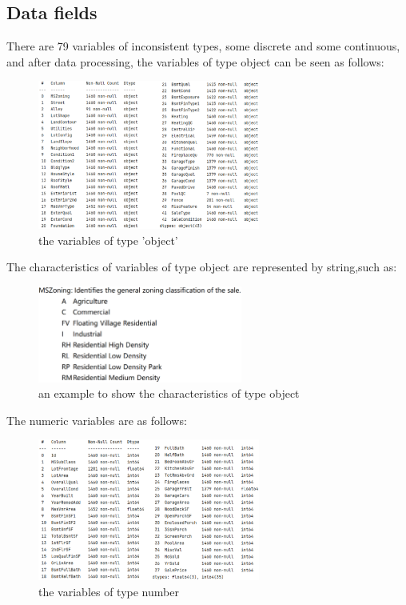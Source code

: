 \documentclass{amsart}
\begin{document}
	\subsection{Data fields}\label{sec-intro}
	There are 79 variables of inconsistent types, some discrete and some continuous, and after data processing, the variables of type object can be seen as follows:
	\begin{figure}[H]
		\centering
		\includegraphics[width=0.65\textwidth]{../Data/Fig1}
		\caption{the variables of type 'object'}\label{object}
	\end{figure}
	The characteristics of variables of type object are represented by string,such as:
	\begin{figure}[H]
		\centering
		\includegraphics[width=0.6\textwidth]{../Data/Fig2}
		\caption{an example to show the characteristics of type object}\label{object}
	\end{figure}
	The numeric variables are as follows:
	\begin{figure}[H]
		\centering
		\includegraphics[width=0.65\textwidth]{../Data/Fig3}
		\caption{the variables of type number}\label{object}
	\end{figure}
\end{document}
